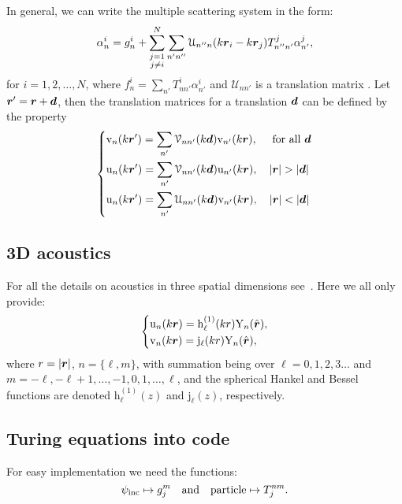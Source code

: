 \documentclass[ 12pt, a4paper]{article}
\begin{document}
In general, we can write the multiple scattering system in the form:
\begin{equation}\label{eq:Individual-expansion-coefficients}
   \alpha_n^i=g_{n}^i
    +\sum_{\substack{j=1\\j\neq i}}^N \sum_{n' n''}\mathcal{U}_{n''n}(k\boldsymbol{r}_i - k\boldsymbol{r}_j)T_{n''n'}^j \alpha_{n'}^j,
\end{equation}
for $i=1,2,\ldots,N$, where $f_n^i = \sum_{n'} T^i_{nn'}\alpha_{n'}^i$ and $\mathcal{U}_{nn'}$ is a translation matrix \cite{Bostrom+Kristensson+Strom1991,Friedman+Russek1954}. Let $\boldsymbol{r}'=\boldsymbol{r}+\boldsymbol{d}$, then
the translation matrices for a translation $\boldsymbol{d}$ can be defined by the property~\cite{Bostrom+Kristensson+Strom1991}
  \begin{equation}\label{eq:translation_spherical_waves}
 \left\{\begin{aligned}
   &\mathrm{v}_n(k\rv')=\sum_{n'}\mathcal{V}_{nn'}(k\dv)\mathrm{v}_{n'}(k\rv),\quad \text{ for all }\dv
   \\
 &\mathrm{u}_n(k\rv')=\sum_{n'}\mathcal{V}_{nn'}(k\dv)\mathrm{u}_{n'}(k\rv),\quad |\rv|>|\dv|
 \\
   &\mathrm{u}_n(k\rv')=\sum_{n'}\mathcal{U}_{nn'}(k\dv)\mathrm{v}_{n'}(k\rv),\quad |\rv|<|\dv|
   \\
 \end{aligned}\right.
 \end{equation}

\subsection{3D acoustics}

For all the details on acoustics in three spatial dimensions see~\cite{gower2020effective}. Here we all only provide:
\begin{equation}
\left\{\begin{aligned}
    & \mathrm u_{n}(k\boldsymbol{r}) = {\mathrm{h}}_\ell^{(1)}(kr)\mathrm{Y}_{n}(\hat{\boldsymbol{r}}),
    \label{eqn:outgoing_waves_and_regular_waves}
    \\
    & \mathrm v_{n}(k\boldsymbol{r}) = \mathrm{j}_\ell(kr)\mathrm{Y}_{n}(\hat{\boldsymbol{r}}),
 \end{aligned}\right.
\end{equation}
where $r=|\boldsymbol{r}|$, $n=\{\ell,m\}$, with summation being over $\ell=0,1,2,3\ldots$ and $m=-\ell,-\ell+1,\ldots,-1,0,1,\ldots,\ell$, and the spherical Hankel and Bessel functions are denoted ${\mathrm{h}}_\ell^{(1)}(z)$ and $\mathrm{j}_\ell(z)$, respectively.

\subsection{Turing equations into code}
For easy implementation we need the functions:
\[
\psi_{\mathrm{inc}} \mapsto g^m_j \quad \text{and} \quad \text{particle} \mapsto T^{nm}_j.
\]
\end{document}
